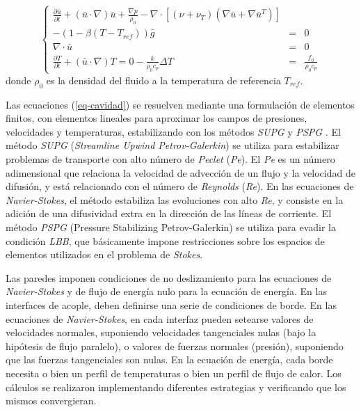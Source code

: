 \begin{equation}
\left\{ \begin{array}{rcl}
\displaystyle \frac {\partial \bar{u}}{\partial t} + ( \bar{u} \cdot \nabla) \bar{u}  + \frac {\nabla p}{\rho_0} - 
\nabla \cdot \left[ \left( \nu + \nu_T \right) \left( \nabla \bar{u} + \nabla \bar{u}^T \right) \right] && \\
- \left( 1- \beta (T-T_{ref}) \right)\bar{g} &=& 0 \\ [0.2cm]
\nabla \cdot \bar{u} &=& 0 \\ [0.2cm]
\displaystyle \frac {\partial T}{\partial t} + ( \bar{u} \cdot \nabla) T =0 - \frac {k}{\rho_0 c_p} \Delta T &=& \displaystyle \frac{f_0}{\rho_0 c_p}
\label{eq-cavidad}
\end{array}
\right.
\end{equation}
donde $\rho_0$ es la densidad del fluido a la temperatura de referencia $T_{ref}$.

Las ecuaciones (\ref{eq-cavidad}) se resuelven mediante una formulación de elementos finitos, 
con elementos lineales para aproximar los campos de presiones, velocidades y temperaturas, 
estabilizando con los métodos \textit{SUPG} \cite{supg} y \textit{PSPG} \cite{pspg}.
El método \textit{SUPG} (\textit{Streamline Upwind Petrov-Galerkin}) se utiliza para estabilizar problemas de transporte con alto número de \textit{Peclet} (\textit{Pe}).
El \textit{Pe} es un número adimensional que relaciona la velocidad de advección de un flujo y la velocidad de difusión, y está relacionado con el número de \textit{Reynolds} (\textit{Re}).
En las ecuaciones de \textit{Navier-Stokes}, el método estabiliza las evoluciones con alto \textit{Re},
y consiste en la adición de una difusividad extra en la dirección de las líneas de corriente.
El método \textit{PSPG} (Pressure Stabilizing Petrov-Galerkin) se utiliza para evadir la condición \textit{LBB},
que básicamente impone restricciones sobre los espacios de elementos utilizados en el problema de \textit{Stokes}.

Las paredes imponen condiciones de no deslizamiento para las ecuaciones de \textit{Navier-Stokes} y de flujo de energía nulo para la ecuación de energía.
En las interfaces de acople, deben definirse una serie de condiciones de borde.
En las ecuaciones de \textit{Navier-Stokes}, en cada interfaz pueden setearse valores de velocidades normales, suponiendo velocidades tangenciales nulas (bajo la hipótesis de flujo paralelo),
o valores de fuerzas normales (presión), suponiendo que las fuerzas tangenciales son nulas.
En la ecuación de energía, cada borde necesita o bien un perfil de temperaturas o bien un perfil de flujo de calor.
Los cálculos se realizaron implementando diferentes estrategias y verificando que los mismos convergieran.

